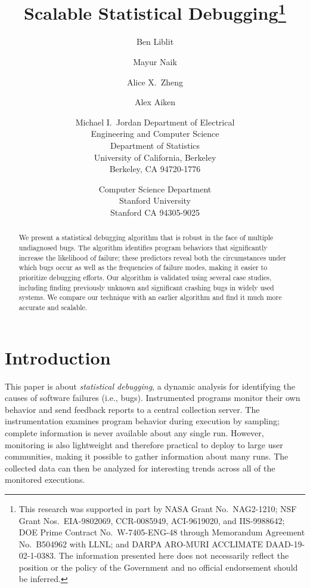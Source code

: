 \documentclass[draft]{sig-alternate}
\title{Scalable Statistical Debugging\thanks{This research was supported in part by NASA Grant No.\
    NAG2-1210; NSF Grant Nos.\ EIA-9802069, CCR-0085949, ACI-9619020,
    and IIS-9988642; DOE Prime Contract No.\ W-7405-ENG-48 through
    Memorandum Agreement No.\ B504962 with LLNL; and DARPA ARO-MURI 
    ACCLIMATE DAAD-19-02-1-0383.  The information
    presented here does not necessarily reflect the position or the
    policy of the Government and no official endorsement should be
    inferred.}
}
\author{%
  Ben Liblit \eecs
  \and Mayur Naik \stan
  \and Alice X.\ Zheng \eecs
  \and Alex Aiken \stan
  \and Michael I.\ Jordan \both
  \moreauthors
  \eecs Department of Electrical \\
  Engineering and Computer Science \\
  \stat Department of Statistics \\
  University of California, Berkeley \\
  Berkeley, CA 94720-1776
  \and
  \stan Computer Science Department \\
  Stanford University \\
  Stanford CA 94305-9025
}
\newcommand{\termdef}[1]{\textit{#1}}
\begin{document}
\maketitle

\begin{abstract}
  We present a statistical debugging algorithm that is
  robust in the face of multiple undiagnosed bugs.  The algorithm
  identifies program behaviors that significantly increase the
  likelihood of failure; these predictors reveal both the
  circumstances under which bugs occur as well as the frequencies of
  failure modes, making it easier to prioritize debugging efforts.
  Our algorithm is validated using several case studies, including finding
  previously unknown and significant crashing bugs in widely used systems.
  We compare our technique with an earlier algorithm and find it much more accurate 
  and scalable.
\end{abstract}






\section{Introduction}
\label{sec:introduction}

This paper is about \termdef{statistical debugging}, a dynamic
analysis for identifying the causes of software failures (i.e., bugs).
Instrumented programs monitor their own behavior and send feedback
reports to a central collection server.  The instrumentation examines
program behavior during execution by sampling; complete information is
never available about any single run.  However, monitoring is also
lightweight and therefore practical to deploy to large user
communities, making it possible to gather information about many runs.
The collected data can then be analyzed for interesting trends across
all of the monitored executions.
\end{document}
